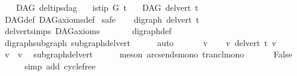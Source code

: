 \begin{isabellebody}
\endisatagproof
{\isafoldproof}%
%
\isadelimproof
\ \isanewline
%
\endisadelimproof
\isanewline
{}\isamarkupfalse%
\ {\isacharparenleft}{\kern0pt}\ DAG{\isacharparenright}{\kern0pt}\ del{\isacharunderscore}{\kern0pt}tips{\isacharunderscore}{\kern0pt}dag{\isacharcolon}{\kern0pt}\isanewline
\ \ \ {\isachardoublequoteopen}is{\isacharunderscore}{\kern0pt}tip\ G\ t{\isachardoublequoteclose}\isanewline
\ \ \ {\isachardoublequoteopen}DAG\ {\isacharparenleft}{\kern0pt}del{\isacharunderscore}{\kern0pt}vert\ t{\isacharparenright}{\kern0pt}{\isachardoublequoteclose}\isanewline
%
\isadelimproof
\ \ %
\endisadelimproof
%
\isatagproof
{}\isamarkupfalse%
\ DAG{\isacharunderscore}{\kern0pt}def\ DAG{\isacharunderscore}{\kern0pt}axioms{\isacharunderscore}{\kern0pt}def\isanewline
{}\isamarkupfalse%
\ safe\isanewline
\ \ \isamarkupfalse%
\ {\isachardoublequoteopen}digraph\ {\isacharparenleft}{\kern0pt}del{\isacharunderscore}{\kern0pt}vert\ t{\isacharparenright}{\kern0pt}{\isachardoublequoteclose}\ \isamarkupfalse%
\ del{\isacharunderscore}{\kern0pt}vert{\isacharunderscore}{\kern0pt}simps\ DAG{\isacharunderscore}{\kern0pt}axioms\ \isanewline
\ \ \ \ \ \ digraph{\isacharunderscore}{\kern0pt}def\isanewline
\ \ \ \ \isamarkupfalse%
\ digraph{\isacharunderscore}{\kern0pt}subgraph\ subgraph{\isacharunderscore}{\kern0pt}del{\isacharunderscore}{\kern0pt}vert\isanewline
\ \ \ \ \isamarkupfalse%
\ auto\ \isanewline
{}\isamarkupfalse%
\ \isanewline
\ \ \isamarkupfalse%
\ v\isanewline
\ \ \isamarkupfalse%
\ {\isachardoublequoteopen}v\ {\isasymrightarrow}\isactrlsup {\isacharplus}{\kern0pt}\isactrlbsub del{\isacharunderscore}{\kern0pt}vert\ t\isactrlesub \ v{\isachardoublequoteclose}\isanewline
\ \ \isamarkupfalse%
\ \isamarkupfalse%
\ {\isachardoublequoteopen}v\ {\isasymrightarrow}\isactrlsup {\isacharplus}{\kern0pt}\ v{\isachardoublequoteclose}\ \isamarkupfalse%
\ subgraph{\isacharunderscore}{\kern0pt}del{\isacharunderscore}{\kern0pt}vert\isanewline
\ \ \ \ \isamarkupfalse%
\ {\isacharparenleft}{\kern0pt}meson\ arcs{\isacharunderscore}{\kern0pt}ends{\isacharunderscore}{\kern0pt}mono\ trancl{\isacharunderscore}{\kern0pt}mono{\isacharparenright}{\kern0pt}\ \isanewline
\ \ \isamarkupfalse%
\ \isamarkupfalse%
\ False\isanewline
\ \ \ \ \isamarkupfalse%
\ {\isacharparenleft}{\kern0pt}simp\ add{\isacharcolon}{\kern0pt}\ cycle{\isacharunderscore}{\kern0pt}free{\isacharparenright}{\kern0pt}\isanewline

\end{isabellebody}

